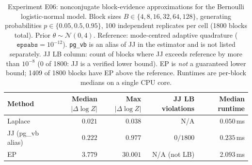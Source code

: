\begin{table}[ht]
\centering
\caption{Experiment E06: nonconjugate block-evidence approximations for the
Bernoulli logistic-normal model. Block sizes $B\in\{4,8,16,32,64,128\}$,
generating probabilities $p\in\{0.05,0.5,0.95\}$, 100 independent replicates per cell
(1800 blocks total). Prior $\theta\sim\mathcal{N}(0,4)$. Reference: mode-centred
adaptive quadrature ($\texttt{epsabs}=10^{-12}$). \texttt{pg\_vb} is an alias of JJ
in the estimator and is not listed separately. JJ LB column: count of blocks where
JJ exceeds reference by more than $10^{-8}$ (0 of 1800: JJ is a verified lower bound).
EP is \emph{not} a guaranteed lower bound; 1409 of 1800 blocks have EP above the
reference. Runtimes are per-block medians on a single CPU core.}
\label{tab:planned-nonconjugate-paper}
\begin{tabular}{lrrrr}
\toprule
Method & Median $|\Delta\log Z|$ & Max $|\Delta\log Z|$ & JJ LB violations & Median runtime \\
\midrule
Laplace        & $0.021$ & $0.038$ & N/A        & $0.050$\,ms \\
JJ (pg\_vb alias) & $0.222$ & $0.977$ & $0/1800$ & $0.235$\,ms \\
EP             & $3.779$ & $30.001$ & N/A (not LB) & $2.093$\,ms \\
\bottomrule
\end{tabular}
\end{table}
